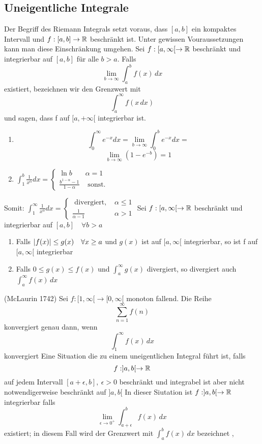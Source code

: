 \subsection{Uneigentliche Integrale}
Der Begriff des Riemann Integrals setzt voraus, dass \( [a,b]\) ein kompaktes Intervall und \(f: [a,b] \rightarrow \mathbb{R} \) beschränkt ist. Unter gewissen Vouraussetzungen kann man diese Einschränkung umgehen. \newline
\Def[5.49] Sei \(f:[a, \infty[ \rightarrow \mathbb{R} \) beschränkt und integrierbar auf \([a,b]\) für alle \( b > a\). Falls
\[ \lim\limits_{b \rightarrow \infty} \int_{a}^{b} f(x) \,dx \]
existiert, bezeichnen wir den Grenzwert mit
\[ \int_{a}^{\infty} f(x \,dx )\]
und sagen, dass f auf \([a, +\infty[ \) integrierbar ist.
\Bsp[5.50]
\begin{enumerate}
    \item \[\int_{0}^{\infty} e^{-x} d x=\lim _{b \rightarrow \infty} \int_{0}^{b} e^{-x} d x=\]
    \[\lim _{b \rightarrow \infty}\left(1-e^{-b}\right)=1\]
    \item $\int_{1}^{b} \frac{1}{x^{\alpha}} d x= \begin{cases}\ln b & \alpha=1 \\ \frac{b^{1-\alpha}-1}{1-\alpha} & \text { sonst. }\end{cases}$
\end{enumerate}
Somit: $\int_{1}^{\infty} \frac{1}{x^{\alpha}} d x=\left\{\begin{array}{cc}\text { divergiert, } & \alpha \leq 1 \\ \frac{1}{\alpha-1} & \alpha>1\end{array}\right.$
\Lemma[5.51] Sei \(f:[a, \infty [ \rightarrow \mathbb{R} \) beschränkt und integrierbar auf \([a,b] \quad \forall b > a\)
\begin{enumerate}
    \item [1] Falls \( \left\lvert f(x) \right\rvert \leq g(x) \quad \forall x \geq a \) und \(g(x)\) ist auf \([a, \infty[ \) integrierbar, so ist f auf \([a, \infty[ \) integrierbar
    \item [2] Falls \( 0 \leq g(x) \leq f(x)\) und \(\int_{a}^{\infty} g(x)\) divergiert, so divergiert auch \( \int_{a}^{\infty} f(x) \,dx \)
\end{enumerate}
\Satz[5.53] (McLaurin 1742) Sei \(f : [1 , \infty[ \rightarrow [0, \infty[ \) monoton fallend. Die Reihe
\[ \sum_{n=1}^{\infty} f(n)\]
konvergiert genau dann, wenn
\[ \int_{1}^{\infty} f(x) \,dx \]
konvergiert \newline
Eine Situation die zu einem uneigentlichen Integral führt ist, falls
\[ f:]a,b[ \rightarrow \mathbb{R}\]
auf jedem Intervall \([a+\epsilon, b],\  \epsilon > 0 \) beschränkt und integrabel ist aber nicht notwendigerweise beschränkt auf \( ]a,b[\) \newline
\Def[5.56] In dieser Siutation ist \( f: ]a,b[ \rightarrow \mathbb{R} \) integrierbar falls
\[ \lim\limits_{\epsilon \rightarrow 0^{+}} \int_{a + \epsilon}^{b} f(x) \,dx \]
existiert; in diesem Fall wird der Grenzwert mit \(\int_{a}^{b} f(x) \,dx \) bezeichnet
\sep
